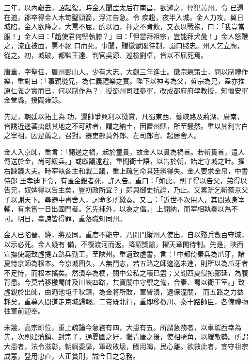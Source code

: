 \begin{pinyinscope}
三年，以內艱去，詔起復。時金人聞孟太后在南昌，欲邀之，徑犯黃州。令
 已還在道，郡卒得金人木笴鑿頭箭，浮江告急。令
 疾趨，夜半入城。金人力攻，翼日城陷。金人欲降之，大罵不屈，酌以酒，揮之不肯飲，又衣以戰袍，曰：「我豈當服！」金人曰：「趙使君何堅執膝？」曰：「但當拜祖宗，豈能拜犬彘！」金人怒鞭之，流血被面，罵不絕
 口而死。事聞，贈徽猷閣待制，謚曰愍忠。州人乞立廟，從之。初，城破，都監王達、判官吳源、巡檢劉卓，皆以不屈死焉。



 唐重，字聖任，眉州彭山人。少有大志。大觀三年進士。徽宗親策士，問以制禮作樂，重對曰：「事親從兄，為仁義禮樂之實。陛下以神考為父，哲宗為兄，盍亦推原仁義之實而已，何以制作為？」授蜀州司理參軍，改成都府府學教授，知懷安軍金堂縣，授闢雍錄。



 先是，朝廷以拓土為
 功，邊帥爭興利以徼賞，凡蜀東西、夔峽路及荊湖、廣南，皆誘近邊蕃夷獻其地之不可耕者，謂之納土，因置州縣，所至騷然。重以其利害白之宰相，因是薦之，召對。遷吏部員外郎、左司郎官、起居舍人。



 金人入京師，重言：「開邊之禍，起於童貫，故金人以貫為禍首。若斬貫首，遣人傳送於金，尚可緩兵。」或獻議遠避，重聞衛士語，以告於朝，始定守城之計。擢右諫議大夫。時宰執各主和戰二議，重上疏乞命其廷辨得失。金人要求金帛，中書侍郎
 王孝迪下令，有匿金銀者死，許人告。重曰：「如此，則子得以告父，弟得以告兄，奴婢得以告主矣，豈初政所宜？」即與御史抗論，乃止。又累疏乞斬蔡京父子以謝天下。尋遷中書舍人，詞命多所繳奏。又言：「近世不次用人，其間致身宰輔，有未嘗一日出國門者。乞先補外，以為之倡。」上開納，而宰相執奏以為不可。明日，臺諫皆得罪，重落職知同州。



 金人已陷晉、絳，將及同。重度不能守，乃開門縱州人使出，自以殘兵數百守城，以示必死。金人疑有
 備，不復渡河而返。降詔獎諭，擢天章閣待制。先是，陜西宣撫使範致虛提五路兵勤王，至陜州。重遺致虛書，言：「中都倚秦兵為爪牙，諸夏恃京師為根本。今京城圍久，人無鬥志，若五路之師逡巡未進，則所以為爪牙者不足恃，而根本搖矣。然潰卒為梗，關中公私之積已盡；又聞西夏侵掠鄜延，為腹背患。今莫若移檄蜀帥及川峽四路，共資關中守禦之備，合秦、蜀以衛王室。」致虛銳於出師，由澠池屯千秋鎮，為金將所敗，軍皆潰，退保潼關，
 而五路之力益耗矣。重募人間道走京城歸報。二帝既北行，重即移檄川、秦十路帥臣，各備禮物往軍前迎奉。



 未幾，高宗即位，重上疏論今急務有四，大患有五。所謂急務者，以車駕西幸為先，次則建藩鎮、封宗子，通夏國之好，繼青唐之後，使相犄角，以緩敵勢。所謂大患者，法令滋彰，朝綱委靡，軍政敗壞，國用竭，民心離。欲救此者，宜守祖宗成憲，登用忠直，大正賞刑，誠今日之急務。




\end{pinyinscope}
